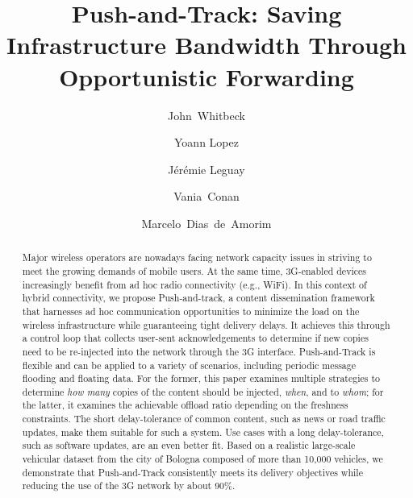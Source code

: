 \documentclass[preprint]{elsarticle}
\begin{document}
\title{Push-and-Track: Saving Infrastructure Bandwidth Through Opportunistic Forwarding}


\author[thales,lip6]{John~Whitbeck}

\author[thales]{Yoann Lopez}

\author[thales]{J{\'e}r{\'e}mie Leguay}

\author[thales]{Vania~Conan}

\author[lip6]{Marcelo~Dias~de~Amorim}

\address[thales]{Thal\`es Communications\\
  160 bd de Valmy~-- 92704 Colombes Cedex~-- France}
\address[lip6]{LIP6/CNRS~-- UPMC Sorbonne Universit\'es \\
  104 avenue du Pr\'esident Kennedy~-- 75016 Paris~-- France}

\begin{abstract}
Major wireless operators are nowadays facing network capacity issues in striving to meet the growing demands of mobile users. At the same time, 3G-enabled devices increasingly benefit from ad hoc radio connectivity (e.g., WiFi). In this context of hybrid connectivity, we propose Push-and-track, a content dissemination framework that harnesses ad hoc communication opportunities to minimize the load on the wireless infrastructure while guaranteeing tight delivery delays. It achieves this through a control loop that collects user-sent acknowledgements to determine if new copies need to be re-injected into the network through the 3G interface. Push-and-Track is flexible and can be applied to a variety of scenarios, including periodic message flooding and floating data. For the former, this paper examines multiple strategies to determine \textit{how many} copies of the content should be injected, \textit{when}, and to \textit{whom}; for the latter, it examines the achievable offload ratio depending on the freshness constraints. The short delay-tolerance of common content, such as news or road traffic updates, make them suitable for such a system. Use cases with a long delay-tolerance, such as software updates, are an even better fit. Based on a realistic large-scale vehicular dataset from the city of Bologna composed of more than 10,000 vehicles, we demonstrate that Push-and-Track consistently meets its delivery objectives while reducing the use of the 3G network by about 90\%.
\end{abstract}
\end{document}
